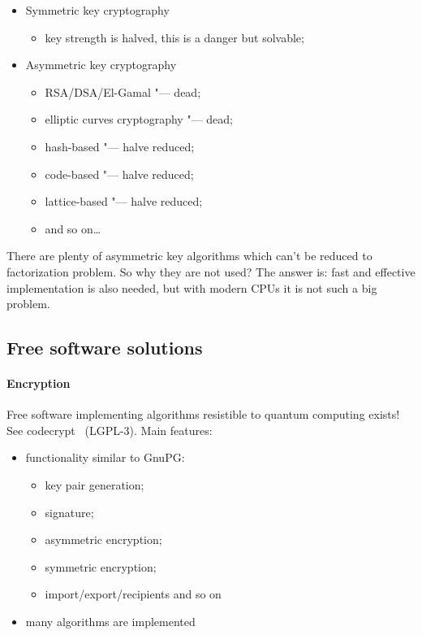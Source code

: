 \documentclass[10pt, a5paper]{article}
\begin{document}
\begin{itemize}
  \item Symmetric key cryptography\begin{itemize}
  \item key strength is halved, this is a danger but solvable;
\end{itemize}


  \item Asymmetric key cryptography\begin{itemize}
  \item RSA/DSA/El-Gamal "--- dead;
  \item elliptic curves cryptography "--- dead;
  \item hash-based "--- halve reduced;
  \item code-based "--- halve reduced;
  \item lattice-based "--- halve reduced;
  \item and so on\ldots{}
\end{itemize}


\end{itemize}

There are plenty of asymmetric key algorithms which can't be \linebreak reduced to factorization problem. So why they are not used? The answer is: fast and effective implementation is also needed, but with modern CPUs it is not such a big problem.

\subsection*{Free software solutions}

\paragraph{Encryption}

Free software implementing algorithms resistible to \linebreak quantum computing exists! See codecrypt~\cite{Savchenko4} (LGPL-3). Main features:

\begin{itemize}
  \item functionality similar to GnuPG:\begin{itemize}
  \item key pair generation;
  \item signature;
  \item asymmetric encryption;
  \item symmetric encryption;
  \item import/export/recipients and so on
\end{itemize}


  \item many algorithms are implemented
\end{itemize}
\end{document}
